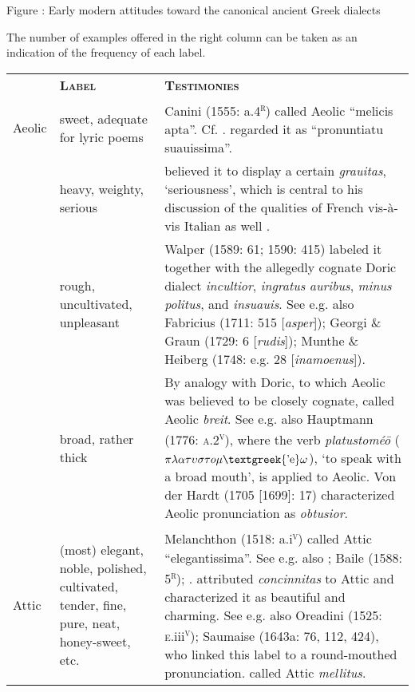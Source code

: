 \begin{stylecaption}
Figure : Early modern attitudes toward the canonical ancient Greek dialects
\end{stylecaption}

The number of examples offered in the right column can be taken as an indication of the frequency of each label.

\tablefirsthead{}

\tabletail{}
\tablelasttail{}
\begin{tabularx}{\textwidth}{XXX}
\lsptoprule

\multicolumn{1}{X}{\textbf{\textsc{Dialect}}} & \textbf{\textsc{Label}} & \textbf{\textsc{Testimonies}}\\
\multicolumn{1}{X}{Aeolic} & sweet, adequate for lyric poems & Canini (1555: a.4\textsc{\textsuperscript{r}}) called Aeolic “melicis apta”. Cf. \citet[103]{Hoius1620}. \citet[106]{Giraudeau1739} regarded it as “pronuntiatu suauissima”.\\
& heavy, weighty, serious & \citet[16]{Estienne1581} believed it to display a certain \textit{grauitas}, ‘seriousness’, which is central to his discussion of the qualities of French vis-à-vis Italian as well \citep[71]{Swiggers2009}.\\
\hhline{~--} & rough, uncultivated, unpleasant & Walper (1589: 61; 1590: 415) labeled it together with the allegedly cognate Doric dialect \textit{incultior}, \textit{ingratus} \textit{auribus}, \textit{minus} \textit{politus}, and \textit{insuauis}. See e.g. also Fabricius (1711: 515 [\textit{asper}]); Georgi \& Graun (1729: 6 [\textit{rudis}]); Munthe \& Heiberg (1748: e.g. 28 [\textit{inamoenus}]).\\
\hhline{~--} & broad, rather thick & By analogy with Doric, to which Aeolic was believed to be closely cognate, \citet[582]{Nibbe1725} called Aeolic \textit{breit}. See e.g. also Hauptmann (1776: \textsc{a.2}\textsc{\textsuperscript{v}}), where the verb \textit{platustoméo\={} } ($\pi \lambda \alpha \tau \upsilon \sigma \tau o\mu \text{\textgreek{'e}}\omega $), ‘to speak with a broad mouth’, is applied to Aeolic. Von der Hardt (1705 [1699]: 17) characterized Aeolic pronunciation as \textit{obtusior}.\\
\multicolumn{1}{X}{Attic} & (most) elegant, noble, polished, cultivated, tender, fine, pure, neat, honey-sweet, etc. & Melanchthon (1518: a.i\textsc{\textsuperscript{v}}) called Attic “elegantissima”. See e.g. also \citet[209]{Vergara1537}; Baile (1588: 5\textsc{\textsuperscript{r}}); \citet[334]{Alsted1630}. \citet[226]{Ruland1556} attributed \textit{concinnitas} to Attic and characterized it as beautiful and charming. See e.g. also Oreadini (1525: \textsc{e}.iii\textsc{\textsuperscript{v}}); Saumaise (1643a: 76, 112, 424), who linked this label to a round-mouthed pronunciation. \citet[96]{Hoius1620} called Attic \textit{mellitus}.\\

\end{tabularx}
